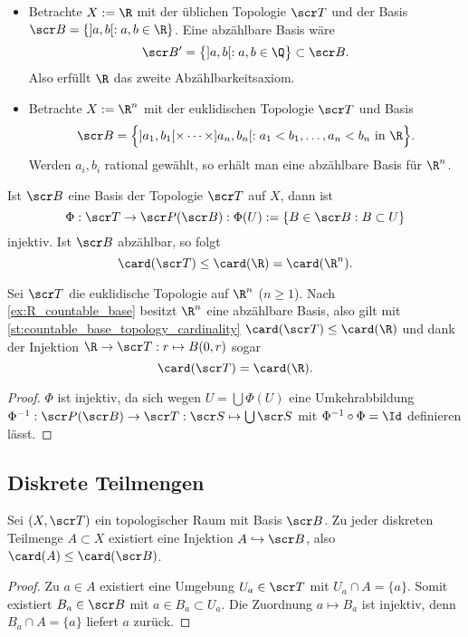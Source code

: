 \begin{ex} \label{ex:R_countable_base}
	\begin{itemize}
		\item
			Betrachte $X := \R$ mit der üblichen Topologie $\scr T$ und der Basis $\scr B = \{ ]a,b[ : a,b \in \R \}$.
			Eine abzählbare Basis wäre
			\[
				\scr B' = \big\{ ]a,b[ : a,b \in \Q \big\} \subset \scr B.
			\]
			Also erfüllt $\R$ das zweite Abzählbarkeitsaxiom.
		\item
			Betrachte $X := \R^n$ mit der euklidischen Topologie $\scr T$ und Basis
			\[
				\scr B = \Big\{ ]a_1,b_1[ \times \dotsb \times ]a_n,b_n[ : a_1 < b_1, \dotsc, a_n < b_n \text{ in $\R$} \Big\}.
			\]
			Werden $a_i, b_i$ rational gewählt, so erhält man eine abzählbare Basis für $\R^n$.
	\end{itemize}
\end{ex}

\begin{st} \label{st:countable_base_topology_cardinality}
	Ist $\scr B$ eine Basis der Topologie $\scr T$ auf $X$, dann ist
	\[
		\Phi
		: \scr T \to \scr P (\scr B)
		: \Phi(U) := \{ B \in \scr B : B \subset U \}
	\]
	injektiv.
	Ist $\scr B$ abzählbar, so folgt
	\[
		\card(\scr T)
		\le \card(\R) = \card(\R^n).
	\]
	\begin{note}
		Sei $\scr T$ die euklidische Topologie auf $\R^n$ ($n\ge 1$).
		Nach \ref{ex:R_countable_base} besitzt $\R^n$ eine abzählbare Basis, also gilt mit \ref{st:countable_base_topology_cardinality} $\card(\scr T) \le \card(\R)$ und dank der Injektion $\R \to \scr T : r \mapsto B(0,r)$ sogar
		\[
			\card(\scr T) = \card(\R).
		\]
	\end{note}
	\begin{proof}
		$\Phi$ ist injektiv, da sich wegen $U = \bigcup \Phi(U)$ eine Umkehrabbildung $\Phi^{-1}: \scr P(\scr B) \to \scr T:  \scr S \mapsto \bigcup \scr S$ mit $\Phi^{-1} \circ \Phi = \Id$ definieren lässt.
	\end{proof}
\end{st}

\subsection{Diskrete Teilmengen}

\begin{lem} \label{st:discrete_subset_cardinality}
	Sei $(X, \scr T)$ ein topologischer Raum mit Basis $\scr B$.
	Zu jeder diskreten Teilmenge $A \subset X$ existiert eine Injektion $A \injto \scr B$, also $\card (A) \le \card(\scr B)$.
	\begin{proof}
		Zu $a \in A$ existiert eine Umgebung $U_a \in \scr T$ mit $U_a \cap A = \{a\}$.
		Somit existiert $B_a \in \scr B$ mit $a \in B_a \subset U_a$.
		Die Zuordnung $a \mapsto B_a$ ist injektiv, denn $B_a \cap A = \{a\}$ liefert $a$ zurück.
	\end{proof}
\end{lem}

